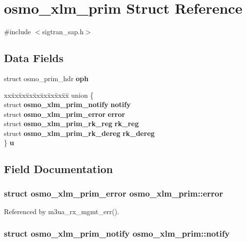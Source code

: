 \section{osmo\+\_\+xlm\+\_\+prim Struct Reference}
\label{structosmo__xlm__prim}


{\ttfamily \#include $<$sigtran\+\_\+sap.\+h$>$}

\subsection*{Data Fields}
\begin{DoxyCompactItemize}
\item 
struct osmo\+\_\+prim\+\_\+hdr {\bf oph}
\item 
\begin{tabbing}
xx\=xx\=xx\=xx\=xx\=xx\=xx\=xx\=xx\=\kill
union \{\\
\>struct {\bf osmo\_xlm\_prim\_notify} {\bf notify}\\
\>struct {\bf osmo\_xlm\_prim\_error} {\bf error}\\
\>struct {\bf osmo\_xlm\_prim\_rk\_reg} {\bf rk\_reg}\\
\>struct {\bf osmo\_xlm\_prim\_rk\_dereg} {\bf rk\_dereg}\\
\} {\bf u}\\

\end{tabbing}\end{DoxyCompactItemize}


\subsection{Field Documentation}
\subsubsection[{error}]{\setlength{\rightskip}{0pt plus 5cm}struct {\bf osmo\+\_\+xlm\+\_\+prim\+\_\+error} osmo\+\_\+xlm\+\_\+prim\+::error}\label{structosmo__xlm__prim_adf974fee059ef47afd8fddb4a1628306}


Referenced by m3ua\+\_\+rx\+\_\+mgmt\+\_\+err().

\subsubsection[{notify}]{\setlength{\rightskip}{0pt plus 5cm}struct {\bf osmo\+\_\+xlm\+\_\+prim\+\_\+notify} osmo\+\_\+xlm\+\_\+prim\+::notify}\label{structosmo__xlm__prim_a6ef1bf624c248f1b972ac12bd1850467}


